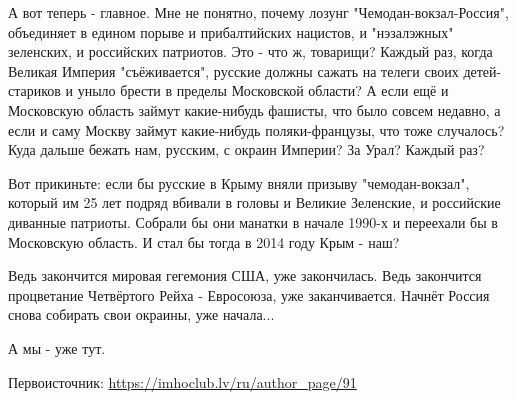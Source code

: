 А вот теперь  -  главное. Мне не понятно, почему лозунг "Чемодан-вокзал-Россия",
объединяет в едином порыве и прибалтийских нацистов, и "нэзалэжных" зеленских,
и российских патриотов. Это  -  что ж, товарищи? Каждый раз, когда Великая
Империя "съёживается", русские должны сажать на телеги своих детей-стариков и
уныло брести в пределы Московской области? А если ещё и Московскую область
займут какие-нибудь фашисты, что было совсем недавно, а если и саму Москву
займут какие-нибудь поляки-французы, что тоже случалось? Куда дальше бежать
нам, русским, с окраин Империи? За Урал? Каждый раз?

Вот прикиньте: если бы русские в Крыму вняли призыву "чемодан-вокзал", который
им 25 лет подряд вбивали в головы и Великие Зеленские, и российские диванные
патриоты. Собрали бы они манатки в начале 1990-х и переехали бы в Московскую
область. И стал бы тогда в 2014 году Крым  -  наш?

Ведь закончится мировая гегемония США, уже закончилась. Ведь закончится
процветание Четвёртого Рейха  -  Евросоюза, уже заканчивается. Начнёт Россия
снова собирать свои окраины, уже начала... 

А мы  -  уже тут.

Первоисточник: \url{https://imhoclub.lv/ru/author_page/91}
